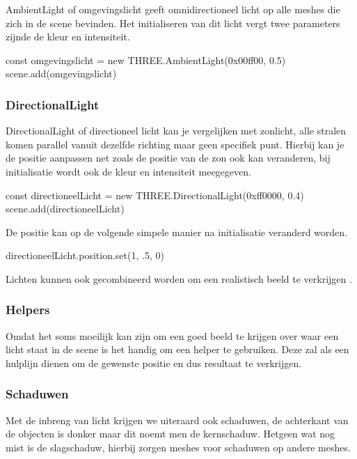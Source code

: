 AmbientLight of omgevingslicht geeft omnidirectioneel licht op alle meshes die zich in de scene bevinden. Het initialiseren van dit licht vergt twee parameters zijnde de kleur en intensiteit.

\begin{LVerbatim}
const omgevingslicht = new THREE.AmbientLight(0x00ff00, 0.5)
scene.add(omgevingslicht)
\end{LVerbatim}

\subsubsection{DirectionalLight}

DirectionalLight of directioneel licht kan je vergelijken met zonlicht, alle stralen komen parallel vanuit dezelfde richting maar geen specifiek punt. Hierbij kan je de positie aanpassen net zoals de positie van de zon ook kan veranderen, bij initialisatie wordt ook de kleur en intensiteit meegegeven.

\begin{LVerbatim}
const directioneelLicht = new THREE.DirectionalLight(0xff0000, 0.4)
scene.add(directioneelLicht)
\end{LVerbatim}

De positie kan op de volgende simpele manier na initialisatie veranderd worden.

\begin{LVerbatim}
directioneelLicht.position.set(1, .5, 0)
\end{LVerbatim}

Lichten kunnen ook gecombineerd worden om een realistisch beeld te verkrijgen  \autocite{Simon2023}.

\subsubsection{Helpers}

Omdat het soms moeilijk kan zijn om een goed beeld te krijgen over waar een licht staat in de scene is het handig om een helper te gebruiken. Deze zal als een hulplijn dienen om de gewenste positie en dus resultaat te verkrijgen.

\subsubsection{Schaduwen}

Met de inbreng van licht krijgen we uiteraard ook schaduwen, de achterkant van de objecten is donker maar dit noemt men de kernschaduw. Hetgeen wat nog mist is de slagschaduw, hierbij zorgen meshes voor schaduwen op andere meshes.

